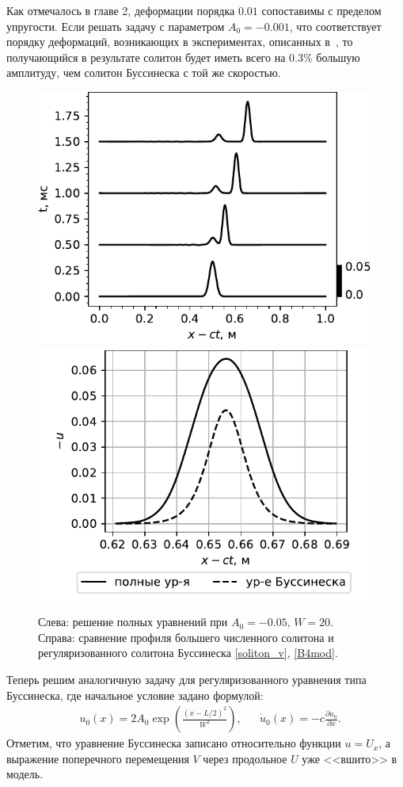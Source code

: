 \documentclass[12pt, a4paper]{report}
\newcommand{\lb}{\left (}
\newcommand{\rb}{\right )}
\newcommand{\pdiff}[2]{\frac{\partial #1}{\partial #2}}
\begin{document}
Как отмечалось в главе 2, деформации порядка $0.01$ сопоставимы с пределом упругости. Если решать задачу с параметром $A_0 = -0.001$, что соответствует порядку деформаций, возникающих в экспериментах, описанных в~\cite{Garbuzov}, то получающийся в результате солитон будет иметь всего на 0.3\% большую амплитуду, чем солитон Буссинеска с той же скоростью.
\begin{figure}[h!]
	\centering
	\includegraphics[width=0.48\linewidth]{figures/SolEvolSmall2}
	\includegraphics[width=0.48\linewidth]{figures/SolCompareSmall2}
	\caption{Слева: решение полных уравнений при $A_0=-0.05$, $W=20$. Справа: сравнение профиля большего численного солитона и регуляризованного солитона Буссинеска \eqref{soliton_v}, \eqref{B4mod}.}
	\label{fig:evolution2}
\end{figure}

Теперь решим аналогичную задачу для регуляризованного уравнения типа Буссинеска, где начальное условие задано формулой:
\begin{align}
\label{3_bq_ic}
& u_0 (x) = 2A_0 \exp\lb \frac{(x - L/2)^2}{W^2}\rb,&  &\dot{u}_0 (x) = -c \pdiff{u_0}{x}.
\end{align}
Отметим, что уравнение Буссинеска записано относительно функции $u = U_{x}$, а выражение поперечного перемещения $V$ через продольное $U$ уже <<вшито>> в модель.
\end{document}

